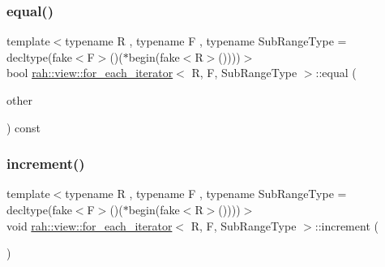 \mbox{\label{structrah_1_1view_1_1for__each__iterator_a233240f479d09d32295d6a244895485c}} 
\subsubsection{\texorpdfstring{equal()}{equal()}}
{\footnotesize\ttfamily template$<$typename R , typename F , typename Sub\+Range\+Type  = decltype(fake$<$\+F$>$()($\ast$begin(fake$<$\+R$>$())))$>$ \\
bool \mbox{\hyperlink{structrah_1_1view_1_1for__each__iterator}{rah\+::view\+::for\+\_\+each\+\_\+iterator}}$<$ R, F, Sub\+Range\+Type $>$\+::equal (\begin{DoxyParamCaption}\item[{\mbox{\hyperlink{structrah_1_1view_1_1for__each__iterator}{for\+\_\+each\+\_\+iterator}}$<$ R, F, Sub\+Range\+Type $>$}]{other }\end{DoxyParamCaption}) const\hspace{0.3cm}{\ttfamily [inline]}}

\mbox{\label{structrah_1_1view_1_1for__each__iterator_aff4bef7aa6d6e667d2b364bb4e0108f7}} 
\subsubsection{\texorpdfstring{increment()}{increment()}}
{\footnotesize\ttfamily template$<$typename R , typename F , typename Sub\+Range\+Type  = decltype(fake$<$\+F$>$()($\ast$begin(fake$<$\+R$>$())))$>$ \\
void \mbox{\hyperlink{structrah_1_1view_1_1for__each__iterator}{rah\+::view\+::for\+\_\+each\+\_\+iterator}}$<$ R, F, Sub\+Range\+Type $>$\+::increment (\begin{DoxyParamCaption}{ }\end{DoxyParamCaption})\hspace{0.3cm}{\ttfamily [inline]}}

